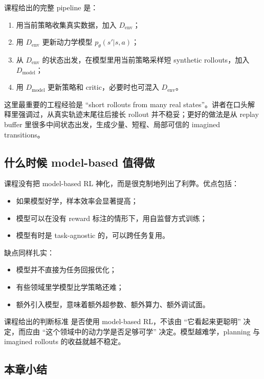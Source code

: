 \documentclass[a4paper]{article}
\begin{document}
课程给出的完整 pipeline 是：

\begin{enumerate}
\item 用当前策略收集真实数据，加入 $D_{\text{env}}$；
\item 用 $D_{\text{env}}$ 更新动力学模型 $p_\theta(s'|s,a)$；
\item 从 $D_{\text{env}}$ 的状态出发，在模型里用当前策略采样短 synthetic rollouts，加入 $D_{\text{model}}$；
\item 用 $D_{\text{model}}$ 更新策略和 critic，必要时也可混入 $D_{\text{env}}$。
\end{enumerate}

这里最重要的工程经验是 ``short rollouts from many real states''。讲者在口头解释里强调过，从真实轨迹末尾往后接长 rollout 并不稳妥；更好的做法是从 replay buffer 里很多中间状态出发，生成少量、短程、局部可信的 imagined transitions。

\subsection{什么时候 model-based 值得做}

课程没有把 model-based RL 神化，而是很克制地列出了利弊。优点包括：

\begin{itemize}
\item 如果模型好学，样本效率会显著提高；
\item 模型可以在没有 reward 标注的情形下，用自监督方式训练；
\item 模型有时是 task-agnostic 的，可以跨任务复用。
\end{itemize}

缺点同样扎实：

\begin{itemize}
\item 模型并不直接为任务回报优化；
\item 有些领域里学模型比学策略还难；
\item 额外引入模型，意味着额外超参数、额外算力、额外调试面。
\end{itemize}

\begin{warningbox}{课程给出的判断标准}
是否使用 model-based RL，不该由 ``它看起来更聪明'' 决定，而应由 ``这个领域中的动力学是否足够可学'' 决定。模型越难学，planning 与 imagined rollouts 的收益就越不稳定。
\end{warningbox}

\subsection{本章小结}
\end{document}
